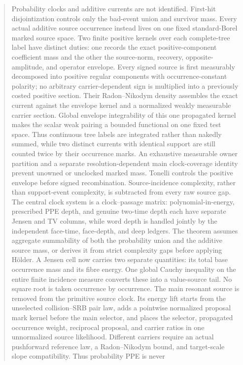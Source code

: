 \documentclass[11pt]{article}
\begin{document}
\begin{abstract}
Probability clocks and additive currents are not identified.  First-hit
disjointization controls only the bad-event union and survivor mass.  Every
actual additive source occurrence instead lives on one fixed standard-Borel
marked source space.  Two finite positive kernels over each complete-tree
label have distinct duties: one records the exact positive-component
coefficient mass and the
other the source-norm, recovery, opposite-amplitude, and operator envelope.
Every signed source is first measurably decomposed into positive regular
components with occurrence-constant polarity; no arbitrary carrier-dependent
sign is multiplied into a previously costed positive section.  Their
Radon--Nikodym density assembles the exact current against the envelope
kernel and a normalized weakly measurable carrier section.  Global envelope
integrability of this one propagated kernel makes the scalar weak pairing a bounded
functional on one fixed test space.  Thus continuous tree labels are
integrated rather than nakedly summed, while two distinct currents with
identical support are still counted twice by their occurrence marks.  An
exhaustive measurable owner partition and a separate resolution-dependent
main clock-coverage identity prevent unowned or unclocked marked mass.
Tonelli controls the positive envelope before signed recombination.  Source-incidence
complexity, rather than support-event complexity, is subtracted from every
raw source gap.  The central clock system is a clock--passage matrix:
polynomial-in-energy, prescribed PPE depth, and genuine two-time depth each
have separate Jensen and TV columns, while word depth is handled jointly by
the independent face-time, face-depth, and deep ledgers.  The theorem assumes
aggregate summability of both the
probability union and the additive source mass, or derives it from strict
complexity gaps before applying H\"older.  A Jensen cell now carries two
separate quantities: its total base occurrence mass and its fibre energy.
One global Cauchy inequality on the entire finite incidence measure converts
these into a value-source tail.  No square root is taken occurrence by
occurrence.  The main resonant source is removed from the primitive source
clock.  Its energy lift starts from the unselected collision--SRB pair law,
adds a pointwise normalized proposal mark kernel before the main selector,
and places the selector, propagated occurrence weight, reciprocal proposal,
and carrier ratios in one unnormalized source likelihood.  Different
carriers require an actual pushforward reference law, a Radon--Nikodym bound,
and target-scale slope compatibility.  Thus probability PPE is never

\end{abstract}
\end{document}
